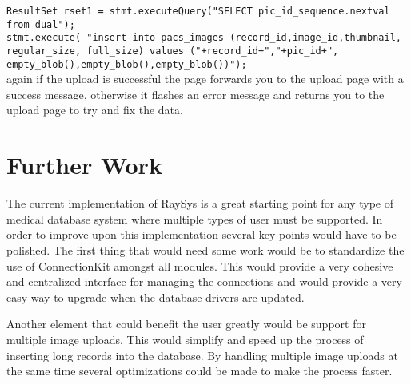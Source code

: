\documentclass[12pt]{report}
\begin{document}
        \texttt{ResultSet rset1 = stmt.executeQuery("SELECT pic\_id\_sequence.nextval\\from dual");}\\
        
        \texttt{stmt.execute( "insert into pacs\_images (record\_id,image\_id,thumbnail,\\regular\_size, full\_size) values ("+record\_id+","+pic\_id+",\\empty\_blob(),empty\_blob(),empty\_blob())");}\\

again if the upload is successful the page forwards you to the upload page with a success message, otherwise it flashes an error message and returns you to the upload page to try and fix the data.

\section*{Further Work}
The current implementation of RaySys is a great starting point for any type of medical database system where multiple types of user must be supported. In order to improve upon this implementation several key points would have to be polished. The first thing that would need some work would be to standardize the use of ConnectionKit amongst all modules. This would provide a very cohesive and centralized interface for managing the connections and would provide a very easy way to upgrade when the database drivers are updated.

Another element that could benefit the user greatly would be support for multiple image uploads. This would simplify and speed up the process of inserting long records into the database. By handling multiple image uploads at the same time several optimizations could be made to make the process faster.
\end{document}
